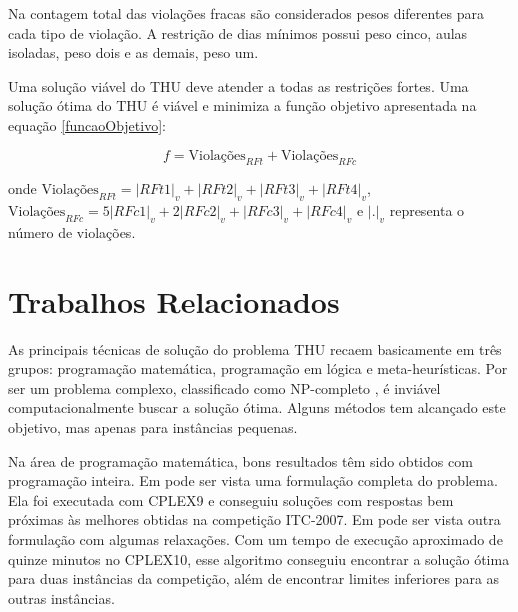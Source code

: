 \documentclass[11pt]{article}
\begin{document}
Na contagem total das violações fracas são considerados pesos diferentes para cada tipo de violação. A restrição de dias mínimos possui peso cinco, aulas isoladas, peso dois e as demais, peso um.

Uma solução viável do THU deve atender a todas as restrições fortes. Uma solução ótima do THU é viável e minimiza a função objetivo apresentada na equação \ref{funcaoObjetivo}:

\begin{equation}\label{funcaoObjetivo}
f = \text{Violações}_{RFt} + \text{Violações}_{RFc}
\end{equation}

\noindent onde $\text{Violações}_{RFt} = |RFt1|_v + |RFt2|_v + |RFt3|_v + |RFt4|_v$, $\text{Violações}_{RFc} = 5|RFc1|_v + 2|RFc2|_v + |RFc3|_v + |RFc4|_v$ e $|.|_v$ representa o número de violações.



\section{Trabalhos Relacionados}
\label{sec:trabalhos_relacionados}

As principais técnicas de solução do problema THU recaem basicamente em três grupos: programação matemática, programação em lógica e meta-heurísticas. Por ser um problema complexo, classificado como NP-completo \cite{Schaerf95asurvey}, é inviável computacionalmente buscar a solução ótima. Alguns métodos tem alcançado este objetivo, mas apenas para instâncias pequenas.

Na área de programação matemática, bons resultados têm sido obtidos com programação inteira. Em \cite{lach_lubbecke} pode ser vista uma formulação completa do problema. Ela foi executada com CPLEX9 e conseguiu soluções com respostas bem próximas às melhores obtidas na competição ITC-2007. Em \cite{Burke_abranch-andcut} pode ser vista outra formulação com algumas relaxações. Com um tempo de execução aproximado de quinze minutos no CPLEX10, esse algoritmo conseguiu encontrar a solução ótima para duas instâncias da competição, além de encontrar limites inferiores para as outras instâncias.
\end{document}
